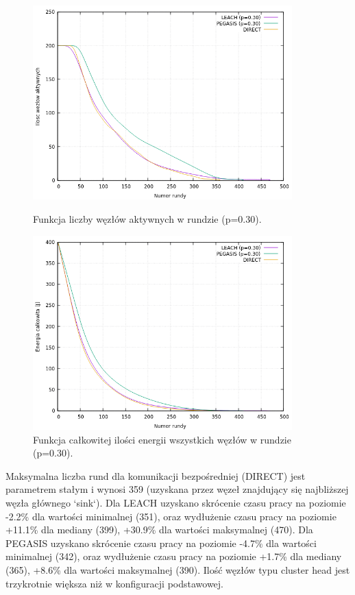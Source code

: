 \documentclass[a4paper,12pt,twoside,openany]{report}
\begin{document}
\begin{figure}[H]
 \centering
 \includegraphics[width=10cm]{images/gnuplot/test_4/nodes_in_round_p030.png}
 \caption{Funkcja liczby węzłów aktywnych w rundzie (p=0.30).}
 \includegraphics[width=10cm]{images/gnuplot/test_4/energy_in_round_p030.png}
 \caption{Funkcja całkowitej ilości energii wszystkich węzłów w rundzie (p=0.30).}
\end{figure}

\par
Maksymalna liczba rund dla komunikacji bezpośredniej (DIRECT) jest parametrem stałym i wynosi 359 (uzyskana przez węzeł znajdujący się najbliższej węzła głównego `sink`).
Dla LEACH uzyskano skrócenie czasu pracy na poziomie -2.2\% dla wartości minimalnej (351), oraz wydłużenie czasu pracy na poziomie +11.1\% dla mediany (399), +30.9\% dla wartości maksymalnej (470).
Dla PEGASIS uzyskano skrócenie czasu pracy na poziomie -4.7\% dla wartości minimalnej (342), oraz wydłużenie czasu pracy na poziomie +1.7\% dla mediany (365), +8.6\% dla wartości maksymalnej (390).
Ilość węzłów typu cluster head jest trzykrotnie większa niż w konfiguracji podstawowej.
\end{document}
